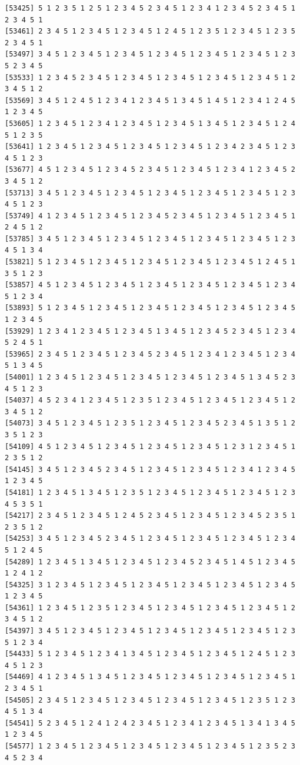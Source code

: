 \documentclass[
  11pt,
]{book}
\begin{document}
\begin{verbatim}
[53425] 5 1 2 3 5 1 2 5 1 2 3 4 5 2 3 4 5 1 2 3 4 1 2 3 4 5 2 3 4 5 1 2 3 4 5 1
[53461] 2 3 4 5 1 2 3 4 5 1 2 3 4 5 1 2 4 5 1 2 3 5 1 2 3 4 5 1 2 3 5 2 3 4 5 1
[53497] 3 4 5 1 2 3 4 5 1 2 3 4 5 1 2 3 4 5 1 2 3 4 5 1 2 3 4 5 1 2 3 5 2 3 4 5
[53533] 1 2 3 4 5 2 3 4 5 1 2 3 4 5 1 2 3 4 5 1 2 3 4 5 1 2 3 4 5 1 2 3 4 5 1 2
[53569] 3 4 5 1 2 4 5 1 2 3 4 1 2 3 4 5 1 3 4 5 1 4 5 1 2 3 4 1 2 4 5 1 2 3 4 5
[53605] 1 2 3 4 5 1 2 3 4 1 2 3 4 5 1 2 3 4 5 1 3 4 5 1 2 3 4 5 1 2 4 5 1 2 3 5
[53641] 1 2 3 4 5 1 2 3 4 5 1 2 3 4 5 1 2 3 4 5 1 2 3 4 2 3 4 5 1 2 3 4 5 1 2 3
[53677] 4 5 1 2 3 4 5 1 2 3 4 5 2 3 4 5 1 2 3 4 5 1 2 3 4 1 2 3 4 5 2 3 4 5 1 2
[53713] 3 4 5 1 2 3 4 5 1 2 3 4 5 1 2 3 4 5 1 2 3 4 5 1 2 3 4 5 1 2 3 4 5 1 2 3
[53749] 4 1 2 3 4 5 1 2 3 4 5 1 2 3 4 5 2 3 4 5 1 2 3 4 5 1 2 3 4 5 1 2 4 5 1 2
[53785] 3 4 5 1 2 3 4 5 1 2 3 4 5 1 2 3 4 5 1 2 3 4 5 1 2 3 4 5 1 2 3 4 5 1 3 4
[53821] 5 1 2 3 4 5 1 2 3 4 5 1 2 3 4 5 1 2 3 4 5 1 2 3 4 5 1 2 4 5 1 3 5 1 2 3
[53857] 4 5 1 2 3 4 5 1 2 3 4 5 1 2 3 4 5 1 2 3 4 5 1 2 3 4 5 1 2 3 4 5 1 2 3 4
[53893] 5 1 2 3 4 5 1 2 3 4 5 1 2 3 4 5 1 2 3 4 5 1 2 3 4 5 1 2 3 4 5 1 2 3 4 5
[53929] 1 2 3 4 1 2 3 4 5 1 2 3 4 5 1 3 4 5 1 2 3 4 5 2 3 4 5 1 2 3 4 5 2 4 5 1
[53965] 2 3 4 5 1 2 3 4 5 1 2 3 4 5 2 3 4 5 1 2 3 4 1 2 3 4 5 1 2 3 4 5 1 3 4 5
[54001] 1 2 3 4 5 1 2 3 4 5 1 2 3 4 5 1 2 3 4 5 1 2 3 4 5 1 3 4 5 2 3 4 5 1 2 3
[54037] 4 5 2 3 4 1 2 3 4 5 1 2 3 5 1 2 3 4 5 1 2 3 4 5 1 2 3 4 5 1 2 3 4 5 1 2
[54073] 3 4 5 1 2 3 4 5 1 2 3 5 1 2 3 4 5 1 2 3 4 5 2 3 4 5 1 3 5 1 2 3 5 1 2 3
[54109] 4 5 1 2 3 4 5 1 2 3 4 5 1 2 3 4 5 1 2 3 4 5 1 2 3 1 2 3 4 5 1 2 3 5 1 2
[54145] 3 4 5 1 2 3 4 5 2 3 4 5 1 2 3 4 5 1 2 3 4 5 1 2 3 4 1 2 3 4 5 1 2 3 4 5
[54181] 1 2 3 4 5 1 3 4 5 1 2 3 5 1 2 3 4 5 1 2 3 4 5 1 2 3 4 5 1 2 3 4 5 3 5 1
[54217] 2 3 4 5 1 2 3 4 5 1 2 4 5 2 3 4 5 1 2 3 4 5 1 2 3 4 5 2 3 5 1 2 3 5 1 2
[54253] 3 4 5 1 2 3 4 5 2 3 4 5 1 2 3 4 5 1 2 3 4 5 1 2 3 4 5 1 2 3 4 5 1 2 4 5
[54289] 1 2 3 4 5 1 3 4 5 1 2 3 4 5 1 2 3 4 5 2 3 4 5 1 4 5 1 2 3 4 5 1 2 4 1 2
[54325] 3 1 2 3 4 5 1 2 3 4 5 1 2 3 4 5 1 2 3 4 5 1 2 3 4 5 1 2 3 4 5 1 2 3 4 5
[54361] 1 2 3 4 5 1 2 3 5 1 2 3 4 5 1 2 3 4 5 1 2 3 4 5 1 2 3 4 5 1 2 3 4 5 1 2
[54397] 3 4 5 1 2 3 4 5 1 2 3 4 5 1 2 3 4 5 1 2 3 4 5 1 2 3 4 5 1 2 3 5 1 2 3 4
[54433] 5 1 2 3 4 5 1 2 3 4 1 3 4 5 1 2 3 4 5 1 2 3 4 5 1 2 4 5 1 2 3 4 5 1 2 3
[54469] 4 1 2 3 4 5 1 3 4 5 1 2 3 4 5 1 2 3 4 5 1 2 3 4 5 1 2 3 4 5 1 2 3 4 5 1
[54505] 2 3 4 5 1 2 3 4 5 1 2 3 4 5 1 2 3 4 5 1 2 3 4 5 1 2 3 5 1 2 3 4 5 1 3 4
[54541] 5 2 3 4 5 1 2 4 1 2 4 2 3 4 5 1 2 3 4 1 2 3 4 5 1 3 4 1 3 4 5 1 2 3 4 5
[54577] 1 2 3 4 5 1 2 3 4 5 1 2 3 4 5 1 2 3 4 5 1 2 3 4 5 1 2 3 5 2 3 4 5 2 3 4

\end{verbatim}
\end{document}
